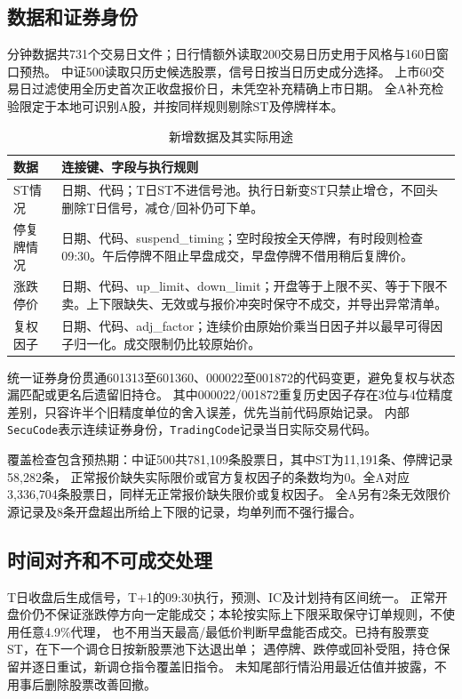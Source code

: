 \documentclass[UTF8,zihao=-4,fontset=fandol]{ctexart}
\begin{document}
\subsection{数据和证券身份}
分钟数据共731个交易日文件；日行情额外读取200交易日历史用于风格与160日窗口预热。
中证500读取\CandidateCount 只历史候选股票，信号日按当日历史成分选择。
上市60交易日过滤使用全历史首次正收盘报价日，未凭空补充精确上市日期。
全A补充检验限定于本地可识别A股，并按同样规则剔除ST及停牌样本。

\begin{table}[H]\centering\small
\caption{新增数据及其实际用途}
\begin{tabularx}{\linewidth}{p{27mm}X}\toprule
数据 & 连接键、字段与执行规则\\\midrule
ST情况 & 日期、代码；T日ST不进信号池。执行日新变ST只禁止增仓，不回头删除T日信号，减仓/回补仍可下单。\\
停复牌情况 & 日期、代码、suspend\_timing；空时段按全天停牌，有时段则检查09:30。午后停牌不阻止早盘成交，早盘停牌不借用稍后复牌价。\\
涨跌停价 & 日期、代码、up\_limit、down\_limit；开盘等于上限不买、等于下限不卖。上下限缺失、无效或与报价冲突时保守不成交，并导出异常清单。\\
复权因子 & 日期、代码、adj\_factor；连续价由原始价乘当日因子并以最早可得因子归一化。成交限制仍比较原始价。\\\bottomrule
\end{tabularx}\end{table}

统一证券身份贯通601313至601360、000022至001872的代码变更，避免复权与状态漏匹配或更名后遗留旧持仓。
其中000022/001872重复历史因子存在3位与4位精度差别，只容许半个旧精度单位的舍入误差，优先当前代码原始记录。
内部\texttt{SecuCode}表示连续证券身份，\texttt{TradingCode}记录当日实际交易代码。

覆盖检查包含预热期：中证500共781,109条股票日，其中ST为11,191条、停牌记录58,282条，
正常报价缺失实际限价或官方复权因子的条数均为0。全A对应3,336,704条股票日，同样无正常报价缺失限价或复权因子。
全A另有2条无效限价源记录及8条开盘超出所给上下限的记录，均单列而不强行撮合。

\subsection{时间对齐和不可成交处理}
T日收盘后生成信号，T+1的09:30执行，预测、IC及计划持有区间统一。
正常开盘价仍不保证涨跌停方向一定能成交；本轮按实际上下限采取保守订单规则，不使用任意4.9\%代理，
也不用当天最高/最低价判断早盘能否成交。已持有股票变ST，在下一个调仓日按新股票池下达退出单；
遇停牌、跌停或回补受阻，持仓保留并逐日重试，新调仓指令覆盖旧指令。
未知尾部行情沿用最近估值并披露，不用事后删除股票改善回撤。
\end{document}
